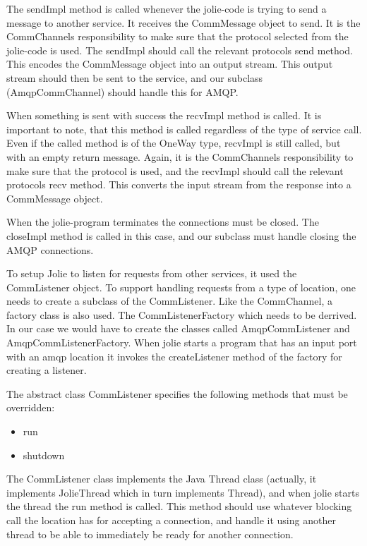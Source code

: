 The sendImpl method is called whenever the jolie-code is trying to send a message to another service. It receives the CommMessage object to send. It is the CommChannels responsibility to make sure that the protocol selected from the jolie-code is used. The sendImpl should call the relevant protocols send method. This encodes the CommMessage object into an output stream. This output stream should then be sent to the service, and our subclass (AmqpCommChannel) should handle this for AMQP.

When something is sent with success the recvImpl method is called. It is important to note, that this method is called regardless of the type of service call. Even if the called method is of the OneWay type, recvImpl is still called, but with an empty return message. Again, it is the CommChannels responsibility to make sure that the protocol is used, and the recvImpl should call the relevant protocols recv method. This converts the input stream from the response into a CommMessage object.

When the jolie-program terminates the connections must be closed. The closeImpl method is called in this case, and our subclass must handle closing the AMQP connections.

To setup Jolie to listen for requests from other services, it used the CommListener object. To support handling requests from a type of location, one needs to create a subclass of the CommListener. Like the CommChannel, a factory class is also used. The CommListenerFactory which needs to be derrived. In our case we would have to create the classes called AmqpCommListener and AmqpCommListenerFactory. When jolie starts a program that has an input port with an amqp location it invokes the createListener method of the factory for creating a listener.

The abstract class CommListener specifies the following methods that must be overridden:
\begin{itemize}
  \item{run}
  \item{shutdown}
\end{itemize}

The CommListener class implements the Java Thread class (actually, it implements JolieThread which in turn implements Thread), and when jolie starts the thread the run method is called. This method should use whatever blocking call the location has for accepting a connection, and handle it using another thread to be able to immediately be ready for another connection.

